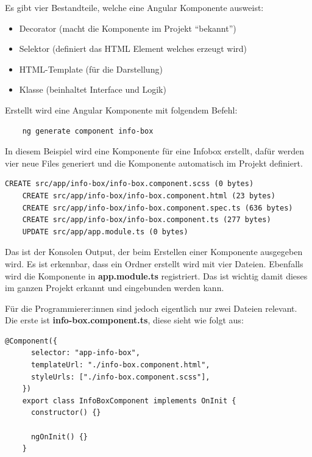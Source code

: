 \newpage

Es gibt vier Bestandteile, welche eine Angular Komponente ausweist:

\begin{itemize}
    \item Decorator (macht die Komponente im Projekt “bekannt”)
    \item Selektor (definiert das HTML Element welches erzeugt wird)
    \item HTML-Template (für die Darstellung)
    \item Klasse (beinhaltet Interface und Logik)
\end{itemize}

Erstellt wird eine Angular Komponente mit folgendem Befehl:

\begin{lstlisting}
    ng generate component info-box
\end{lstlisting}

In diesem Beispiel wird eine Komponente für eine Infobox erstellt, dafür werden vier neue Files generiert und die Komponente automatisch im Projekt definiert.

\begin{lstlisting}[caption=Komponentenerstellung Konsolenausgabe]
    CREATE src/app/info-box/info-box.component.scss (0 bytes)
    CREATE src/app/info-box/info-box.component.html (23 bytes)
    CREATE src/app/info-box/info-box.component.spec.ts (636 bytes)
    CREATE src/app/info-box/info-box.component.ts (277 bytes)
    UPDATE src/app/app.module.ts (0 bytes)
\end{lstlisting}

Das ist der Konsolen Output, der beim Erstellen einer Komponente ausgegeben wird. Es ist erkennbar, dass ein Ordner erstellt wird mit vier Dateien. Ebenfalls wird die Komponente in \textbf{app.module.ts} registriert. Das ist wichtig damit dieses im ganzen Projekt erkannt und eingebunden werden kann.

Für die Programmierer:innen sind jedoch eigentlich nur zwei Dateien relevant.
Die erste ist \textbf{info-box.component.ts}, diese sieht wie folgt aus:

\begin{lstlisting}[caption=Angular Typescript Komponente Grundaufbau]
    @Component({
      selector: "app-info-box",
      templateUrl: "./info-box.component.html",
      styleUrls: ["./info-box.component.scss"],
    })
    export class InfoBoxComponent implements OnInit {
      constructor() {}
    
      ngOnInit() {}
    }
\end{lstlisting}


